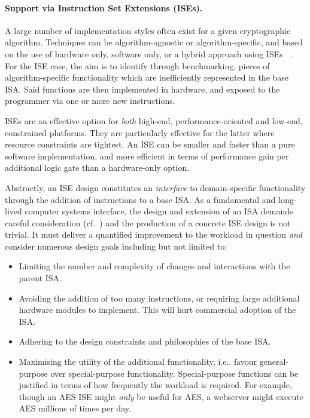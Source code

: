 
\paragraph{Support via Instruction Set Extensions (ISEs).}

A large number of implementation styles often exist
for a given cryptographic algorithm.
Techniques can be
   algorithm-agnostic
   or
   algorithm-specific,
and based on the use of   
   hardware              only,
                software only,
   or
   a hybrid approach using ISEs ~\cite{GalBer:11,BarGioMar:09,RegIen:16}.
For the ISE case, the aim is to identify through benchmarking, pieces of
algorithm-specific functionality which are inefficiently represented in the
base ISA.
Said functions are then implemented in hardware, and exposed to the
programmer via one or more new instructions.

ISEs are an effective option for {\em both}
high-end, performance-oriented
and
 low-end, constrained
platforms. 
They are particularly effective for the latter where resource constraints
are tightest.
An ISE can be smaller and faster than a pure software implementation,
and more efficient in terms of performance gain per additional logic gate
than a hardware-only option.

Abstractly, an ISE design constitutes
an {\em interface} to domain-specific functionality through the
addition of instructions to a base ISA.
As a fundamental and long-lived computer systems interface, the design
and extension of an ISA demands careful consideration
(cf.~\cite[Section 4]{Gueron:09})
and the production of a concrete ISE design is not trivial.
It must deliver a quantified improvement to the workload in 
question {\em and}
consider numerous design goals including but not limited to:

\begin{itemize}
\item Limiting the number and complexity of changes and interactions with the
    parent ISA.
\item Avoiding the addition of too many instructions, or requiring large
    additional hardware modules to implement. This will hurt commercial
    adoption of the ISA.
\item Adhering to the design constraints and philosophies of the base ISA.
\item Maximising the utility of the additional functionality,
      i.e.,
      favour general-purpose over special-purpose functionality.
      Special-purpose functions can be justified in terms of how frequently
      the workload is required.
      For example, though an AES ISE might {\em only}
      be useful for AES, a webserver might execute AES millions of times
      per day.
\end{itemize}


